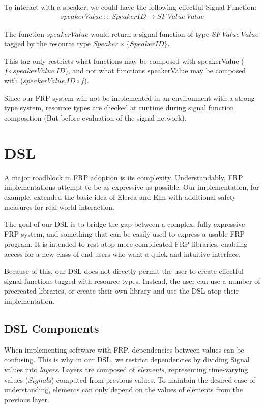 \documentclass[twocolumn,11pt,english]{article}
\begin{document}
To interact with a speaker, we could have the following effectful Signal Function:
\small
\begin{align*}
  speakerValue~::~SpeakerID \rightarrow SF~Value~Value
\end{align*}
\normalsize

The function $speakerValue$ would return a signal function of type $SF~Value~Value$ tagged by the resource type $Speaker \times \{SpeakerID\}$. 

This tag only restricts what functions may be composed with speakerValue ($f \circ speakerValue~ID$), and not what functions speakerValue may be composed with ($speakerValue~ID \circ f$).

Since our FRP system will not be implemented in an environment with a strong type system, resource types are checked at runtime during signal function composition (But before evaluation of the signal network). 

\section{DSL}

A major roadblock in FRP adoption is its complexity. Understandably, FRP implementations attempt to be as expressive as possible. Our implementation, for example, extended the basic idea of Elerea and Elm with additional safety measures for real world interaction. 

The goal of our DSL is to bridge the gap between a complex, fully expressive FRP system, and something that can be easily used to express a usable FRP program. It is intended to rest atop more complicated FRP libraries, enabling access for a new class of end users who want a quick and intuitive interface.

Because of this, our DSL does not directly permit the user to create effectful signal functions tagged with resource types. Instead, the user can use a number of precreated libraries, or create their own library and use the DSL atop their implementation. 

\subsection{DSL Components}

When implementing software with FRP, dependencies between values can be confusing. This is why in our DSL, we restrict dependencies by dividing Signal values into \textit{layers}. Layers are composed of \textit{elements}, representing time-varying values ($Signal$s) computed from previous values. To maintain the desired ease of understanding, elements can only depend on the values of elements from the previous layer. 
\end{document}
